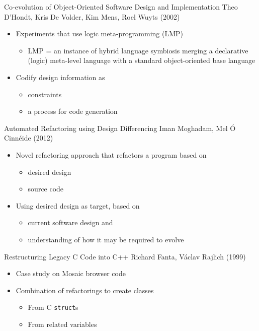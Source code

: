 \documentclass{beamer}
\begin{document}
\begin{frame}{Co-evolution of Object-Oriented Software Design and Implementation}
  {Theo D'Hondt, Kris De Volder, Kim Mens, Roel Wuyts (2002)}
 \begin{itemize}
  \item Experiments that use logic meta-programming (LMP)
  \begin{itemize}
  	\item LMP = an instance of hybrid language symbiosis merging a declarative (logic) meta-level language with a standard object-oriented base language
  \end{itemize}
  \pause
  \item Codify design information as
  \begin{itemize}
    \item constraints
    \item a process for code generation
  \end{itemize}
\end{itemize}
\end{frame}

\begin{frame}{Automated Refactoring using Design Differencing}
  {Iman Moghadam, Mel Ó Cinnéide (2012)}
  
  \begin{itemize}
  	\item Novel refactoring approach that refactors a program based on 
  	\begin{itemize}
  		\item desired design
  		\item source code
  	\end{itemize}
  	\pause
  	\item Using desired design as target, based on
  	\begin{itemize}
  		\item current software design and
  		\item understanding of how it may be required to evolve
  	\end{itemize}
  \end{itemize}
\end{frame}

\begin{frame}{Restructuring Legacy C Code into C++}
  {Richard Fanta, Václav Rajlich (1999)}
  
  \begin{itemize}
    \item Case study on Mosaic browser code
    \pause
    \item Combination of refactorings to create classes
    \begin{itemize}
      \item From C \texttt{struct}s
      \item From related variables
    \end{itemize}
  \end{itemize}
\end{frame}
\end{document}
